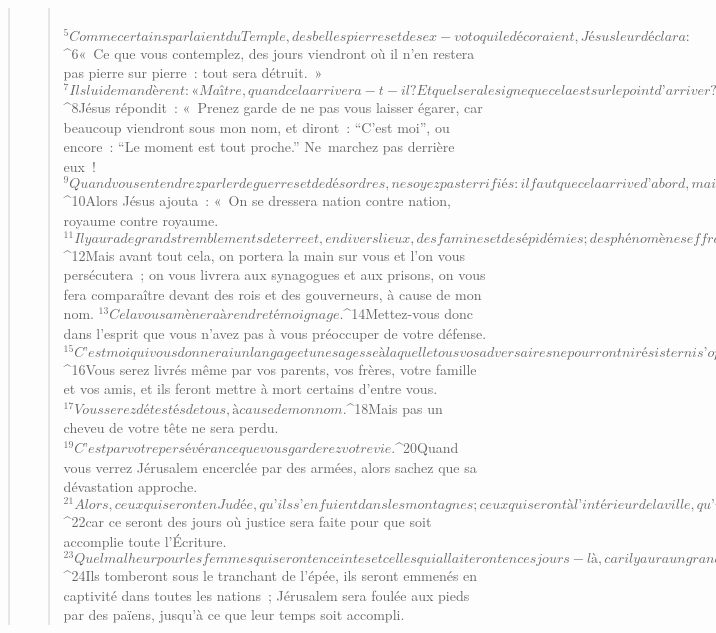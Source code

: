 \begin{verse}
\begin{verse}
         
${}^{5}Comme certains parlaient du Temple, des belles pierres et des ex-voto qui le décoraient, Jésus leur déclara : 
${}^{6}« Ce que vous contemplez, des jours viendront où il n’en restera pas pierre sur pierre : tout sera détruit. » 
${}^{7}Ils lui demandèrent : « Maître, quand cela arrivera-t-il ? Et quel sera le signe que cela est sur le point d’arriver ? » 
${}^{8}Jésus répondit : « Prenez garde de ne pas vous laisser égarer, car beaucoup viendront sous mon nom, et diront : “C’est moi”, ou encore : “Le moment est tout proche.” Ne marchez pas derrière eux ! 
${}^{9}Quand vous entendrez parler de guerres et de désordres, ne soyez pas terrifiés : il faut que cela arrive d’abord, mais ce ne sera pas aussitôt la fin. »
${}^{10}Alors Jésus ajouta : « On se dressera nation contre nation, royaume contre royaume. 
${}^{11}Il y aura de grands tremblements de terre et, en divers lieux, des famines et des épidémies ; des phénomènes effrayants surviendront, et de grands signes venus du ciel.
${}^{12}Mais avant tout cela, on portera la main sur vous et l’on vous persécutera ; on vous livrera aux synagogues et aux prisons, on vous fera comparaître devant des rois et des gouverneurs, à cause de mon nom. 
${}^{13}Cela vous amènera à rendre témoignage. 
${}^{14}Mettez-vous donc dans l’esprit que vous n’avez pas à vous préoccuper de votre défense. 
${}^{15}C’est moi qui vous donnerai un langage et une sagesse à laquelle tous vos adversaires ne pourront ni résister ni s’opposer. 
${}^{16}Vous serez livrés même par vos parents, vos frères, votre famille et vos amis, et ils feront mettre à mort certains d’entre vous. 
${}^{17}Vous serez détestés de tous, à cause de mon nom. 
${}^{18}Mais pas un cheveu de votre tête ne sera perdu. 
${}^{19}C’est par votre persévérance que vous garderez votre vie.
${}^{20}Quand vous verrez Jérusalem encerclée par des armées, alors sachez que sa dévastation approche. 
${}^{21}Alors, ceux qui seront en Judée, qu’ils s’enfuient dans les montagnes ; ceux qui seront à l’intérieur de la ville, qu’ils s’en éloignent ; ceux qui seront à la campagne, qu’ils ne rentrent pas en ville, 
${}^{22}car ce seront des jours où justice sera faite pour que soit accomplie toute l’Écriture. 
${}^{23}Quel malheur pour les femmes qui seront enceintes et celles qui allaiteront en ces jours-là, car il y aura un grand désarroi dans le pays, une grande colère contre ce peuple. 
${}^{24}Ils tomberont sous le tranchant de l’épée, ils seront emmenés en captivité dans toutes les nations ; Jérusalem sera foulée aux pieds par des païens, jusqu’à ce que leur temps soit accompli.

\end{verse}
\end{verse}
